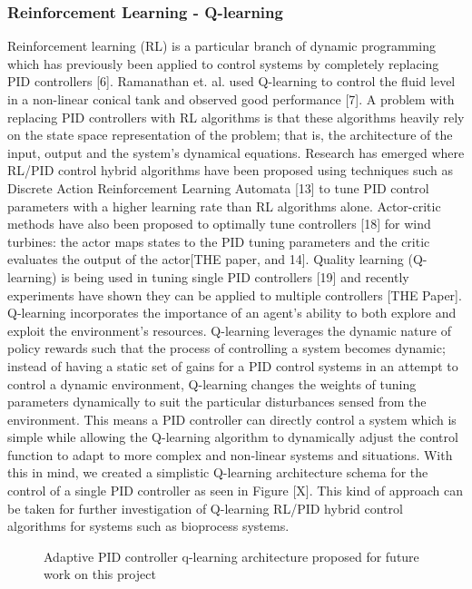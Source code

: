 \documentclass[conference]{IEEEtran}
\theoremstyle{definition}
\begin{document}
\subsubsection{Reinforcement Learning - Q-learning}
\noindent Reinforcement learning (RL) is a particular branch of dynamic programming which has previously been applied to control systems by completely replacing PID controllers [6]. Ramanathan et. al. used Q-learning to control the fluid level in a non-linear conical tank and observed good performance [7]. A problem with replacing PID controllers with RL algorithms is that these algorithms heavily rely on the state space representation of the problem; that is, the architecture of the input, output and the system's dynamical equations. 
Research has emerged where RL/PID control hybrid algorithms have been proposed using techniques such as Discrete Action Reinforcement Learning Automata [13] to tune PID control parameters with a higher learning rate than RL algorithms alone. Actor-critic methods have also been proposed to optimally tune controllers [18] for wind turbines: the actor maps states to the PID tuning parameters and the critic evaluates the output of the actor[THE paper, and 14]. Quality learning (Q-learning) is being used in tuning single PID controllers [19] and recently experiments have shown they can be applied to multiple controllers [THE Paper]. Q-learning incorporates the importance of an agent's ability to both explore and exploit the environment's resources. Q-learning leverages the dynamic nature of policy rewards such that the process of controlling a system becomes dynamic; instead of having a static set of gains for a PID control systems in an attempt to control a dynamic environment, Q-learning changes the weights of tuning parameters dynamically to suit the particular disturbances sensed from the environment. This means a PID controller can directly control a system which is simple while allowing the Q-learning algorithm to dynamically adjust the control function to adapt to more complex and non-linear systems and situations. With this in mind, we created a simplistic Q-learning architecture schema for the control of a single PID controller as seen in Figure [X]. This kind of approach can be taken for further investigation of Q-learning RL/PID hybrid control algorithms for systems such as bioprocess systems.
\begin{figure}[h!]
    \caption{Adaptive PID controller q-learning architecture proposed for future work on this project}
    \label{q-learning}
\end{figure}
\end{document}
